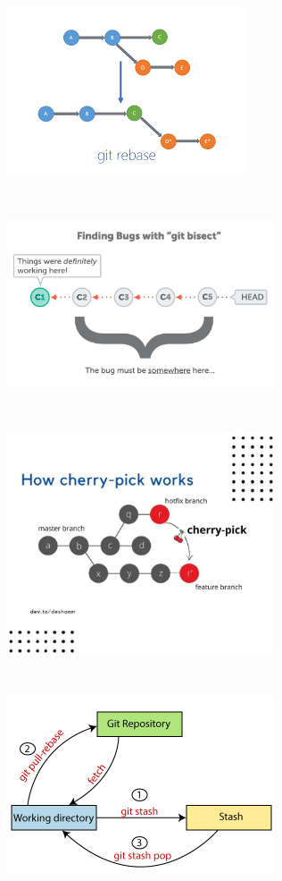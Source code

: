 \documentclass[11pt,xcolor={dvipsnames}]{beamer} %
\begin{document}
\begin{frame}
	\includegraphics{rebase.png}
\end{frame}

\begin{frame}
	\includegraphics[height=250px,width=300px]{bisect-overview.png}
\end{frame}

\begin{frame}
	\includegraphics[height=250px,width=300px]{cherry-pick.jpg}
\end{frame}

\begin{frame}
	\includegraphics[height=250px,width=300px]{git-stash.png}
\end{frame}
\end{document}
